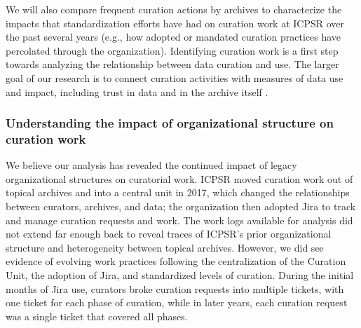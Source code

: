 \documentclass[conference]{IEEEtran}
\begin{document}
We will also compare frequent curation actions by archives to characterize the impacts that standardization efforts have had on curation work at ICPSR over the past several years (e.g., how adopted or mandated curation practices have percolated through the organization). Identifying curation work is a first step towards analyzing the relationship between data curation and use. The larger goal of our research is to connect curation activities with measures of data use and impact, including trust in data and in the archive itself \cite{Plantin2019-ba, Plantin2021-hl}.

\subsubsection{Understanding the impact of organizational structure on curation work}
\label{understanding-impact-of-organizational-structure}
We believe our analysis has revealed the continued impact of legacy organizational structures on curatorial work. ICPSR moved curation work out of topical archives and into a central unit in 2017, which changed the relationships between curators, archives, and data; the organization then adopted Jira to track and manage curation requests and work. The work logs available for analysis did not extend far enough back to reveal traces of ICPSR’s prior organizational structure and heterogeneity between topical archives. However, we did see evidence of evolving work practices following the centralization of the Curation Unit, the adoption of Jira, and standardized levels of curation. During the initial months of Jira use, curators broke curation requests into multiple tickets, with one ticket for each phase of curation, while in later years, each curation request was a single ticket that covered all phases.  
\end{document}
